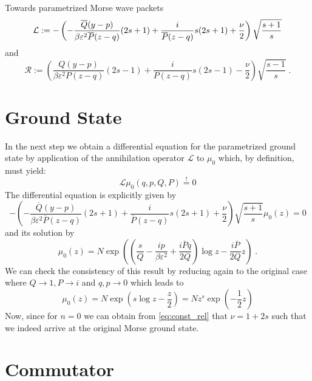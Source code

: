 \begin{chapter}{Towards parametrized Morse wave packets}
\begin{equation}
    \label{eq:param_lop}
    \mathcal{L}:=-\left(-\frac{\overline{Q}(y-p)}{\beta\varepsilon^2 \overline{P}(z-q)}(2s+1)+\frac{i}{\overline{P}(z-q)}s(2s+1)+\frac{\nu}{2} \right)\sqrt{\frac{s+1}{s}}\\
\end{equation}
 and 
\begin{equation}
    \label{eq:param_rop}
    \mathcal{R}:=\left(\frac{Q(y-p)}{\beta\varepsilon^2 P(z-q) }(2s-1)+\frac{i}{P(z-q)}s(2s-1)-\frac{\nu}{2} \right)\sqrt{\frac{s-1}{s}}\;.
\end{equation}

\section{Ground State} %
\label{sec:Ground State}
In the next step we obtain a differential equation for the parametrized ground state by application of the annihilation operator $\mathcal{L}$
to $\mu_0$ which, by definition, must yield:
\begin{equation}
    \mathcal{L}\mu_0(q,p,Q,P)\stackrel{!}{=}0
\end{equation}
The differential equation is explicitly given by
\begin{equation}
    -\left(-\frac{\overline{Q}(y-p)}{\beta\varepsilon^2\overline{P}(z-q)}(2s+1)+\frac{i}{\overline{P}(z-q)}s(2s+1)+\frac{\nu}{2} \right)\sqrt{\frac{s+1}{s}}
    \mu_0(z)=0
\end{equation}
and its solution by
\begin{equation}
    \mu_0(z)=N\exp\left(\left(\frac{s}{Q}-\frac{ip}{\beta\varepsilon^2}+\frac{i\overline{P}q}{2Q}\right)\log z-\frac{i\overline{P}}{2Q}z \right)\; .
\end{equation}
We can check the consistency of this result by reducing again to the original case where $Q\to 1, P\to i$ and $q,p \to 0$ which leads to
\begin{equation}
    \mu_0(z)=N\exp\left(s\log z-\frac{z}{2}\right)=Nz^s\exp\left(-\frac{1}{2}z\right)
\end{equation}
Now, since for $n=0$ we can obtain from \eqref{eq:const_rel} that $\nu=1+2s$ such that we indeed arrive at the original Morse ground state.


\section{Commutator} %
\label{sec:Commutator}


\end{chapter}

